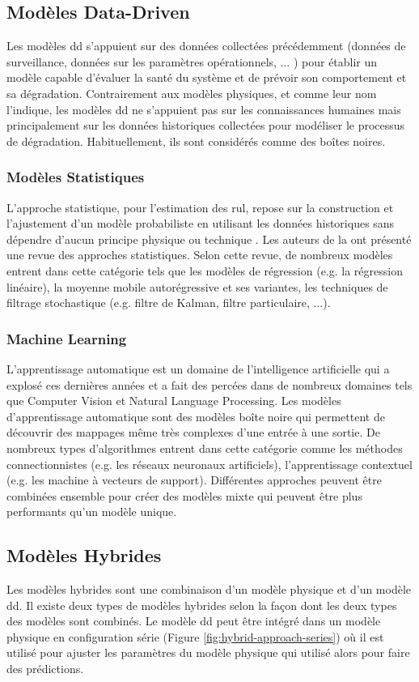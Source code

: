 \subsection{Modèles Data-Driven}
Les modèles \acrshort{dd} s'appuient sur des données collectées précédemment (données de surveillance, données sur les paramètres opérationnels, ... ) pour établir un modèle capable d'évaluer la santé du système et de prévoir son comportement et sa dégradation. Contrairement aux modèles physiques, et comme leur nom l'indique, les modèles \acrshort{dd} ne s'appuient pas sur les connaissances humaines mais principalement sur les données historiques collectées pour modéliser le processus de dégradation. Habituellement, ils sont considérés comme des boîtes noires.

\subsubsection{Modèles Statistiques}
L'approche statistique, pour l'estimation des \acrshort{rul}, repose sur la construction et l'ajustement d'un modèle probabiliste en utilisant les données historiques sans dépendre d'aucun principe physique ou technique \cite{Si2011}. 
Les auteurs de la \cite{Si2011} ont présenté une revue des approches statistiques. Selon cette revue, de nombreux modèles entrent dans cette catégorie tels que les modèles de régression (e.g. la régression linéaire), la moyenne mobile autorégressive et ses variantes, les techniques de filtrage stochastique (e.g. filtre de Kalman, filtre particulaire, ...).

\subsubsection{Machine Learning}
L'apprentissage automatique est un domaine de l'intelligence artificielle qui a explosé ces dernières années et a fait des percées dans de nombreux domaines tels que Computer Vision et Natural Language Processing. Les modèles d'apprentissage automatique sont des modèles boîte noire qui permettent de découvrir des mappages même très complexes d'une entrée à une sortie. De nombreux types d'algorithmes entrent dans cette catégorie comme les méthodes connectionnistes (e.g. les réseaux neuronaux artificiels), l'apprentissage contextuel (e.g. les machine à vecteurs de support). Différentes approches peuvent être combinées ensemble pour créer des modèles mixte qui peuvent être plus performants qu'un modèle unique.

\subsection{Modèles Hybrides}
Les modèles hybrides sont une combinaison d'un modèle physique et d'un modèle \acrlong{dd}. Il existe deux types de modèles hybrides selon la façon dont les deux types des modèles sont combinés. Le modèle \acrlong{dd} peut être intégré dans un modèle physique en configuration série (Figure \ref{fig:hybrid-approach-series}) où il est utilisé pour ajuster les paramètres du modèle physique qui utilisé alors pour faire des prédictions.

